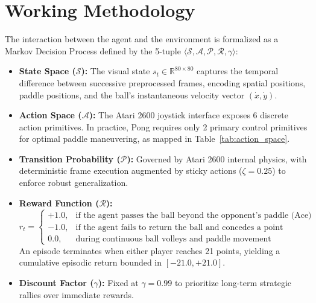 \documentclass[12pt,a4paper]{report}
\begin{document}
\section{Working Methodology}
The interaction between the agent and the environment is formalized as a Markov Decision Process defined by the 5-tuple $\langle \mathcal{S}, \mathcal{A}, \mathcal{P}, \mathcal{R}, \gamma \rangle$:
\begin{itemize}
    \item \textbf{State Space ($\mathcal{S}$):} The visual state $s_t \in \mathbb{R}^{80 \times 80}$ captures the temporal difference between successive preprocessed frames, encoding spatial positions, paddle positions, and the ball's instantaneous velocity vector $(\dot{x}, \dot{y})$.
    \item \textbf{Action Space ($\mathcal{A}$):} The Atari 2600 joystick interface exposes 6 discrete action primitives. In practice, Pong requires only 2 primary control primitives for optimal paddle maneuvering, as mapped in Table~\ref{tab:action_space}.
    \item \textbf{Transition Probability ($\mathcal{P}$):} Governed by Atari 2600 internal physics, with deterministic frame execution augmented by sticky actions ($\zeta = 0.25$) to enforce robust generalization.
    \item \textbf{Reward Function ($\mathcal{R}$):}
    \begin{equation}
        r_t = \begin{cases}
            +1.0, & \text{if the agent passes the ball beyond the opponent's paddle (Ace)} \\
            -1.0, & \text{if the agent fails to return the ball and concedes a point} \\
            0.0, & \text{during continuous ball volleys and paddle movement}
        \end{cases}
    \end{equation}
    An episode terminates when either player reaches 21 points, yielding a cumulative episodic return bounded in $[-21.0, +21.0]$.
    \item \textbf{Discount Factor ($\gamma$):} Fixed at $\gamma = 0.99$ to prioritize long-term strategic rallies over immediate rewards.
\end{itemize}
\end{document}
